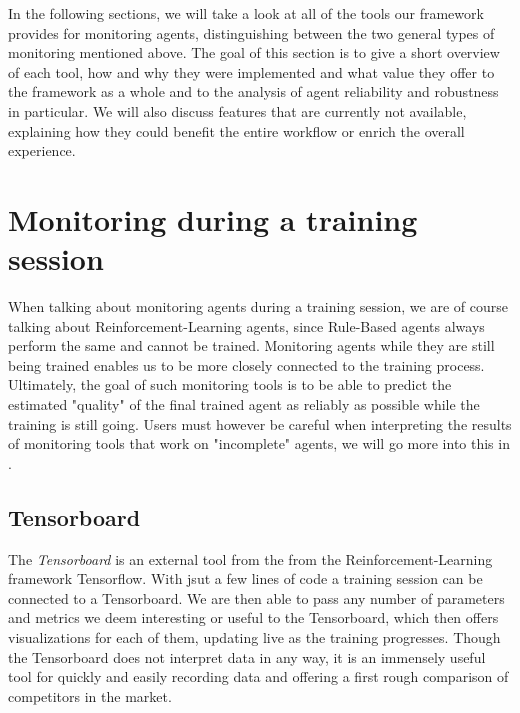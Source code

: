 In the following sections, we will take a look at all of the tools our framework provides for monitoring agents, distinguishing between the two general types of monitoring mentioned above. The goal of this section is to give a short overview of each tool, how and why they were implemented and what value they offer to the framework as a whole and to the analysis of agent reliability and robustness in particular. We will also discuss features that are currently not available, explaining how they could benefit the entire workflow or enrich the overall experience.

\section{Monitoring during a training session}

When talking about monitoring agents during a training session, we are of course talking about Reinforcement-Learning agents, since Rule-Based agents always perform the same and cannot be trained.  Monitoring agents while they are still being trained enables us to be more closely connected to the training process. Ultimately, the goal of such monitoring tools is to be able to predict the estimated "quality" of the final trained agent as reliably as possible while the training is still going. Users must however be careful when interpreting the results of monitoring tools that work on "incomplete" agents, we will go more into this  in .

\subsection{Tensorboard}

The \emph{Tensorboard} is an external tool from the from the Reinforcement-Learning framework  Tensorflow. With jsut a few lines of code  a training session can be connected to a Tensorboard. We are then able to pass any number of parameters and metrics we deem interesting or useful to the Tensorboard, which then offers visualizations for each of them, updating live as the training progresses. Though the Tensorboard does not interpret data in any way, it is an immensely  useful tool for quickly and easily recording data and offering a first rough comparison of competitors in the market.

